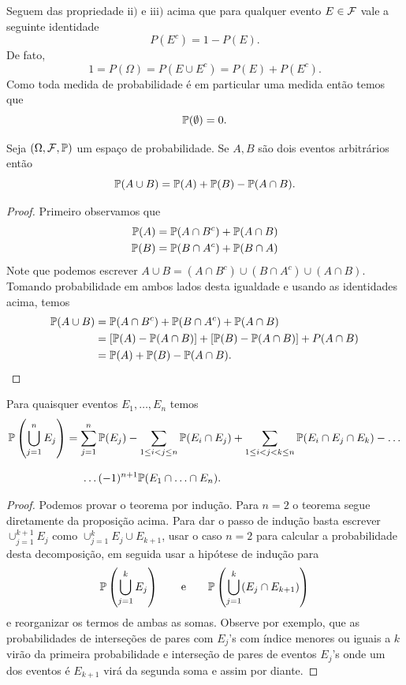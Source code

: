 Seguem das propriedade $\textrm{ii})$ e $\textrm{iii})$ acima que 
para qualquer evento $E\in\F$ vale a seguinte identidade
	\[
		P(E^c)=1-P(E).
	\]
De fato, 
	\[
		1=P(\Omega)= P(E\cup E^c)=P(E)+P(E^c).
	\]
Como toda medida de probabilidade é em particular uma medida então 
temos que 
	\[
		\P(\emptyset)=0.
	\] 
\begin{proposicao} Seja $(\Omega,\F,\P)$ um espaço de probabilidade.
Se $A,B$ são dois eventos arbitrários então 
	\[
		\P(A\cup B) = \P(A)+\P(B)-\P(A\cap B).
	\]
\end{proposicao}
\begin{proof}
Primeiro observamos que 
%	
	\begin{align*}
		\P(A) = \P(A\cap B^c)+\P(A\cap B) 
		\\
		\P(B) = \P(B\cap A^c)+\P(B\cap A) 
	\end{align*}
Note que podemos escrever $A\cup B = (A\cap B^c) \cup (B\cap A^c) \cup (A\cap B)$.
Tomando probabilidade em ambos lados desta igualdade 
e usando as identidades acima, temos
	\begin{align*}
	\P(A\cup B) 
	&=
	\P(A\cap B^c) + \P(B\cap A^c) + \P(A\cap B)
	\\
	&=
	[\P(A)-\P(A\cap B)] + [\P(B)-\P(A\cap B)] + P(A\cap B)
	\\
	&=
	\P(A)+\P(B)-\P(A\cap B).
	\end{align*}


\end{proof}

\begin{teorema}
Para quaisquer eventos $E_1,\ldots,E_n$ temos 
	\begin{align*}
		\P\left( \bigcup_{j=1}^{n} E_j \right)
		&=
		\sum_{j=1}^n \P(E_j)
		-
		\sum_{1\leq i<j\leq n} \P(E_i\cap E_j) 
		+
		\sum_{1\leq i<j<k\leq n} \P(E_i\cap E_j\cap E_k)-\ldots
		\\[0.3cm]
		&\hspace*{0.5cm} \ldots(-1)^{n+1} \P(E_1\cap\ldots\cap E_n).
	\end{align*}
\end{teorema}

\begin{proof}
 Podemos provar o teorema por indução. Para $n=2$ o teorema
 segue diretamente da proposição acima. Para dar o passo de 
 indução basta escrever $\cup_{j=1}^{k+1} E_j$ 
 como $\cup_{j=1}^{k}E_j\cup E_{k+1}$, usar o caso $n=2$ 
 para calcular a probabilidade desta decomposição, em seguida usar 
 a hipótese de indução para 
 \[	
 \P \left( \bigcup_{j=1}^{k} E_j \right)
 \qquad
 \text{e}
 \qquad
 \P \left( \bigcup_{j=1}^{k} (E_j\cap E_{k+1}) \right)
 \]
 e reorganizar os termos de ambas as somas. Observe 
 por exemplo, que as probabilidades de interseções de pares 
 com $E_j$'s com índice menores ou iguais a $k$ virão 
 da primeira probabilidade e interseção de pares de
 eventos $E_j$'s onde um dos eventos é $E_{k+1}$ virá 
 da segunda soma e assim por diante.
\end{proof}


